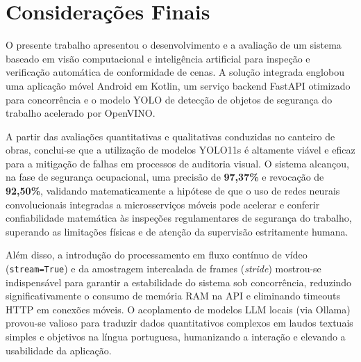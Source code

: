 \chapter{Considerações Finais}
\label{chap:consideracoes}

O presente trabalho apresentou o desenvolvimento e a avaliação de um sistema baseado em visão computacional e inteligência artificial para inspeção e verificação automática de conformidade de cenas. A solução integrada englobou uma aplicação móvel Android em Kotlin, um serviço backend FastAPI otimizado para concorrência e o modelo YOLO de detecção de objetos de segurança do trabalho acelerado por OpenVINO.

A partir das avaliações quantitativas e qualitativas conduzidas no canteiro de obras, conclui-se que a utilização de modelos YOLO11s é altamente viável e eficaz para a mitigação de falhas em processos de auditoria visual. O sistema alcançou, na fase de segurança ocupacional, uma precisão de \textbf{97,37\%} e revocação de \textbf{92,50\%}, validando matematicamente a hipótese de que o uso de redes neurais convolucionais integradas a microsserviços móveis pode acelerar e conferir confiabilidade matemática às inspeções regulamentares de segurança do trabalho, superando as limitações físicas e de atenção da supervisão estritamente humana.

Além disso, a introdução do processamento em fluxo contínuo de vídeo (\texttt{stream=True}) e da amostragem intercalada de frames (\textit{stride}) mostrou-se indispensável para garantir a estabilidade do sistema sob concorrência, reduzindo significativamente o consumo de memória RAM na API e eliminando timeouts HTTP em conexões móveis. O acoplamento de modelos LLM locais (via Ollama) provou-se valioso para traduzir dados quantitativos complexos em laudos textuais simples e objetivos na língua portuguesa, humanizando a interação e elevando a usabilidade da aplicação.

